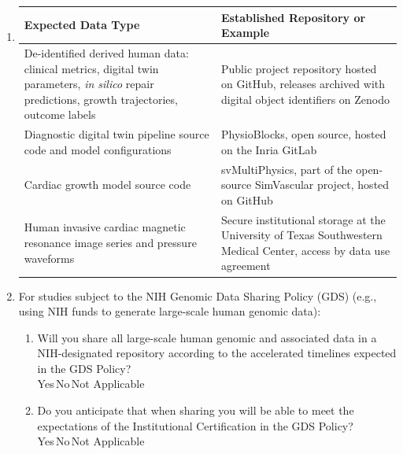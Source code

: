 \documentclass[11pt]{article}
\newcommand{\chk}{\raisebox{-1pt}{$\boxtimes$}}
\newcommand{\unchk}{\raisebox{-1pt}{$\square$}}
\begin{document}
\begin{enumerate}[leftmargin=2em, itemsep=.8em]
\item \begin{tabular}[t]{|p{}|p{}|}
\hline
\textbf{Expected Data Type} & \textbf{Established Repository or Example} \\
\hline
De-identified derived human data: clinical metrics, digital twin parameters, {\it in silico} repair predictions, growth trajectories, outcome labels & Public project repository hosted on GitHub, releases archived with digital object identifiers on Zenodo \\
\hline
Diagnostic digital twin pipeline source code and model configurations & PhysioBlocks, open source, hosted on the Inria GitLab \\
\hline
Cardiac growth model source code & svMultiPhysics, part of the open-source SimVascular project, hosted on GitHub \\
\hline
Human invasive cardiac magnetic resonance image series and pressure waveforms & Secure institutional storage at the University of Texas Southwestern Medical Center, access by data use agreement \\
\hline
\end{tabular}

\item For studies subject to the NIH Genomic Data Sharing Policy (GDS) (e.g., using NIH funds to generate large-scale human genomic data):
\begin{enumerate}[label=\alph*., leftmargin=1.5em, itemsep=.6em, topsep=.5em]
\item Will you share all large-scale human genomic and associated data in a NIH-designated repository according to the accelerated timelines expected in the GDS Policy?\\[.2em]
Yes\,\unchk\quad No\,\unchk\quad Not Applicable\,\chk
\item Do you anticipate that when sharing you will be able to meet the expectations of the Institutional Certification in the GDS Policy?\\[.2em]
Yes\,\unchk\quad No\,\unchk\quad Not Applicable\,\chk
\end{enumerate}

\end{enumerate}
\end{document}
